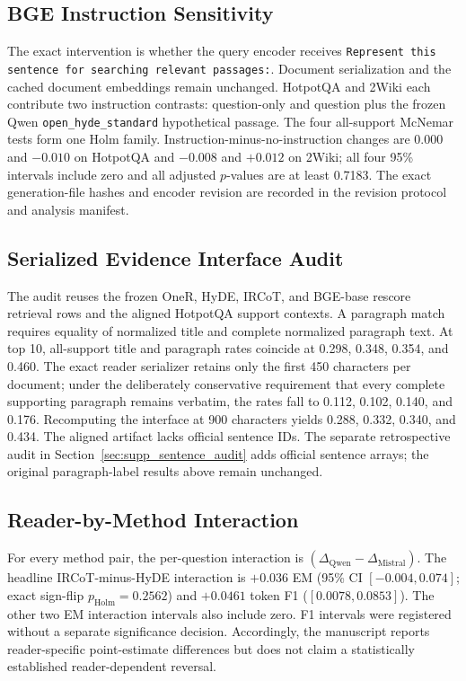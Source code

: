 \documentclass[pdflatex,sn-basic,Numbered]{sn-jnl}
\begin{document}
\subsection{BGE Instruction Sensitivity}

The exact intervention is whether the query encoder receives \texttt{Represent this sentence for searching relevant passages:}. Document serialization and the cached document embeddings remain unchanged. HotpotQA and 2Wiki each contribute two instruction contrasts: question-only and question plus the frozen Qwen \texttt{open\_hyde\_standard} hypothetical passage. The four all-support McNemar tests form one Holm family. Instruction-minus-no-instruction changes are 0.000 and $-0.010$ on HotpotQA and $-0.008$ and $+0.012$ on 2Wiki; all four 95\% intervals include zero and all adjusted $p$-values are at least 0.7183. The exact generation-file hashes and encoder revision are recorded in the revision protocol and analysis manifest.

\subsection{Serialized Evidence Interface Audit}

The audit reuses the frozen OneR, HyDE, IRCoT, and BGE-base rescore retrieval rows and the aligned HotpotQA support contexts. A paragraph match requires equality of normalized title and complete normalized paragraph text. At top 10, all-support title and paragraph rates coincide at 0.298, 0.348, 0.354, and 0.460. The exact reader serializer retains only the first 450 characters per document; under the deliberately conservative requirement that every complete supporting paragraph remains verbatim, the rates fall to 0.112, 0.102, 0.140, and 0.176. Recomputing the interface at 900 characters yields 0.288, 0.332, 0.340, and 0.434. The aligned artifact lacks official sentence IDs. The separate retrospective audit in Section~\ref{sec:supp_sentence_audit} adds official sentence arrays; the original paragraph-label results above remain unchanged.

\subsection{Reader-by-Method Interaction}

For every method pair, the per-question interaction is $(\Delta_{\mathrm{Qwen}}-\Delta_{\mathrm{Mistral}})$. The headline IRCoT-minus-HyDE interaction is $+0.036$ EM (95\% CI $[-0.004,0.074]$; exact sign-flip $p_{\mathrm{Holm}}=0.2562$) and $+0.0461$ token F1 ($[0.0078,0.0853]$). The other two EM interaction intervals also include zero. F1 intervals were registered without a separate significance decision. Accordingly, the manuscript reports reader-specific point-estimate differences but does not claim a statistically established reader-dependent reversal.
\end{document}
